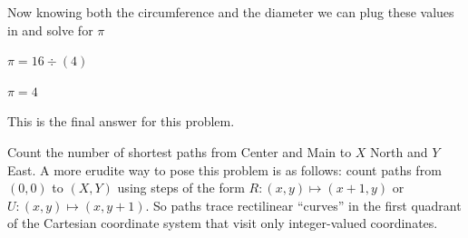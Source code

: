 \documentclass[10pt, AMS Euler]{article}
\begin{document}
	\bigskip
	\noindent

	Now knowing both the circumference and the diameter we can plug these values in and solve for $\pi$

	\bigskip
	\noindent

	$\pi = 16\div(4)$

\bigskip
	\noindent

	$\boxed{\pi = 4}$

\bigskip
	\noindent

	This is the final answer for this problem. 
	
\bigskip
	\noindent
	
	  Count the number of shortest paths from Center and Main to $X$ North and $Y$ East.  A more erudite way to pose this problem is as follows: count paths from $(0,0)$ to $(X,Y)$ using steps of the form $R: (x,y) \mapsto (x+1,y)$ or $U:(x,y) \mapsto (x,y+1)$.  So paths trace rectilinear ``curves'' in the first quadrant of the Cartesian coordinate system that visit only integer-valued coordinates. \\
	
	\vspace{1em}
\end{document}
